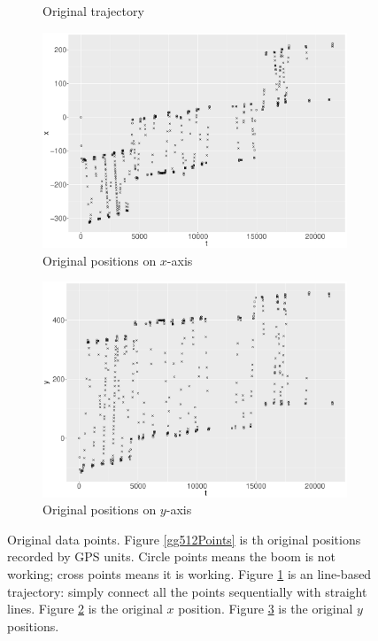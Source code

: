 \begin{figure}
\begin{subfigure}{0.45\textwidth}
    \caption{Original trajectory}\label{gg512Path}
    \end{subfigure}
    \begin{subfigure}{0.45\textwidth}
    \centering
    \includegraphics[width=\textwidth]{Chapters/02TractorSplineTheory/plot/ggplot/gg512PointsX.pdf}
    \caption{Original positions on $x$-axis}\label{gg512PointsX}
    \end{subfigure}
    \begin{subfigure}{0.45\textwidth}
    \centering
    \includegraphics[width=\textwidth]{Chapters/02TractorSplineTheory/plot/ggplot/gg512PointsY.pdf}
    \caption{Original positions on $y$-axis}\label{gg512PointsY}
    \end{subfigure}
\caption{Original data points. Figure \ref{gg512Points} is th original positions recorded by GPS units. Circle points means the boom is not working; cross points means it is working. Figure \ref{gg512Path} is an line-based trajectory: simply connect all the points sequentially with straight lines. Figure \ref{gg512PointsX} is the original $x$ position. Figure \ref{gg512PointsY} is the original $y$ positions.}\label{original512}
 \end{figure}


